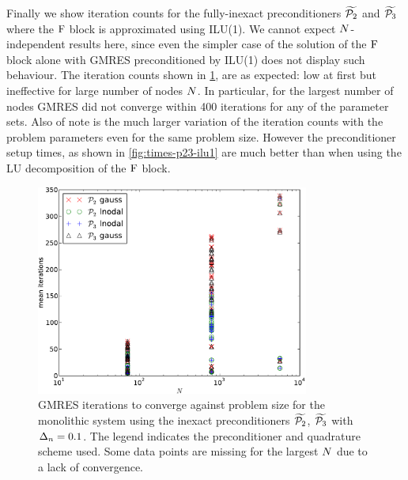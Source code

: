Finally we show iteration counts for the fully-inexact preconditioners $\widetilde{\mathcal{P}_2}$ and $\widetilde{\mathcal{P}_3}$ where the $\mathrm{F}$ block is approximated using ILU(1).
We cannot expect $N$-independent results here, since even the simpler case of the solution of the $\mathrm{F}$ block alone with GMRES preconditioned by ILU(1) does not display such behaviour.
The iteration counts shown in \cref{fig:its-p23-ilu1}, are as expected: low at first but ineffective for large number of nodes $N$.
In particular, for the largest number of nodes GMRES did not converge within 400 iterations for any of the parameter sets.
Also of note is the much larger variation of the iteration counts with the problem parameters even for the same problem size.
However the preconditioner setup times, as shown in \cref{fig:times-p23-ilu1} are much better than when using the LU decomposition of the $\mathrm{F}$ block.


\begin{figure}
  \centering
  \includegraphics[width=0.8\textwidth]{plots/linear_solvers_p2p3/implicitilu-1-meanofnsolveritersvsinitialnnode.pdf}
  \caption{
    \newtonmean{}
    GMRES iterations to converge against problem size for the monolithic system using the inexact preconditioners $\widetilde{\mathcal{P}_2}$, $\widetilde{\mathcal{P}_3}$ with $\Delta_{n}=0.1$.
    The legend indicates the preconditioner and quadrature scheme used.
    \manydatapointsPrecLegend{}
    Some data points are missing for the largest $N$ due to a lack of convergence.
  }
  \label{fig:its-p23-ilu1}
\end{figure}

